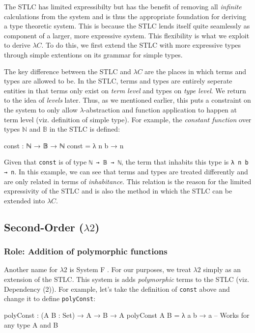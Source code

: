 \documentclass[12pt]{article}
\begin{document}
The STLC has limited expressibilty but has the benefit of removing all
\textit{infinite} calculations from the system \cite{} and is thus the
appropriate foundation for deriving a type theoretic system. This is because
the STLC lends itself quite seamlessly as component of a larger, more expressive
system. This flexibility is what we exploit to derive \(\lambda C\). To do this,
we first extend the STLC with more expressive types through simple extentions on
its grammar for simple types.

The key difference between the STLC and \(\lambda C\) are the places in which
terms and types are allowed to be. In the STLC, terms and types are entirely
seperate entities in that terms only exist on {\em term level} and types
on {\em type level}. We return to the idea of {\em levels} later. Thus, as we
mentioned earlier, this puts a constraint on the system to only allow
\(\lambda\)-abstraction and function application to happen at term level
(viz. definition of simple type). For example, the \textit{constant function}
over types \(\mathbb{N}\) and \(\mathbb{B}\) in the STLC is defined:
\begin{center}
\begin{minipage}{0.5\textwidth}
\begin{code}
const : ℕ → 𝔹 → ℕ
const = λ n b → n
\end{code}
\end{minipage}
\end{center}
Given that {\tt const} is of type {\tt ℕ → 𝔹 → ℕ}, the term that inhabits this
type is {\tt λ n b → n}. In this example, we can see that terms and types are
treated differently and are only related in terms of {\em inhabitance}. This
relation is the reason for the limited expressivity of the STLC and is also the
method in which the STLC can be extended into \(\lambda C\).

\subsection*{Second-Order (\(\lambda2\))}
\subsubsection*{Role: Addition of polymorphic functions}

Another name for \(\lambda2\) is System F \cite{}. For our purposes, we treat
\(\lambda2\) simply as an extension of the STLC. This system is adds
{\em polymorphic} terms to the STLC (viz. Dependency (2)). For example,
let's take the definition of {\tt const} above and change it to define
{\tt polyConst}:
\begin{center}
\begin{minipage}{0.5\textwidth}
\begin{code}
polyConst : (A B : Set) → A → B → A
polyConst A B = λ a b → a
-- Works for any type A and B
\end{code}
\end{minipage}
\end{center}
\end{document}
